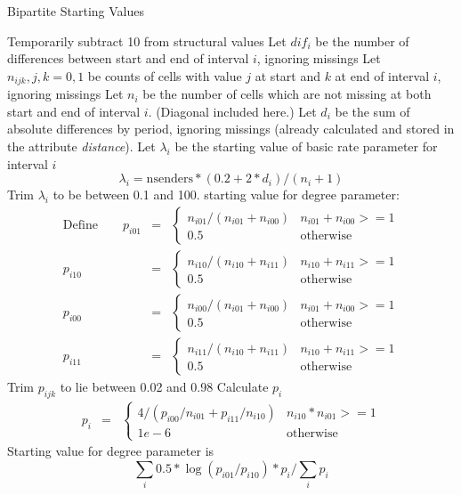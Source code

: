 \documentclass[12pt,a4paper]{article}
\makeatletter
\renewcommand{\=}{\,=\,}
\newcommand{\+}{\,+\,}
\newcommand{\nnm}[1]{\textsf{\small\textit{#1}}}
\renewcommand{\subsection}{\@startsection{subsection}{2}
                {0pt}{0.7\baselineskip}{0.3\baselineskip}
                {\sffamily} }
\makeatother
\begin{document}
\subsection{Bipartite Starting Values}
\label{sec:bipartitestart}
\begin{algorithmic}
\STATE Temporarily subtract 10 from structural values
\STATE Let $dif_i$ be the number of differences between start and end of
interval $i$, ignoring missings
\STATE Let $n_{ijk}, j, k = 0,1$ be counts of cells with value $j$ at start
and $k$ at end of interval $i$, ignoring missings
\STATE Let $n_i$ be the number of cells which are not missing at both start
and end of interval $i$. (Diagonal included here.)
\STATE Let $d_i$ be the sum of absolute differences by period, ignoring missings
(already calculated and stored in the attribute \nnm{distance}).
\STATE Let $\lambda_i$ be the starting value of basic rate parameter for
interval $i$
\STATE
$$\lambda_i = \mathrm{nsenders} * (0.2 + 2 * d_i)/(n_i + 1)$$
\STATE Trim $\lambda_i$ to be between 0.1 and 100.
\STATE starting value for degree parameter:
\begin{align*}
\mathrm{Define } \qquad  p_{i01} &=& \begin{cases}
n_{i01}/ (n_{i01} + n_{i00}) &n_{i01} + n_{i00} >= 1  \\
0.5& \mathrm{otherwise}
\end{cases}\\
p_{i10} &=& \begin{cases}
n_{i10}/ (n_{i10} + n_{i11}) &n_{i10} + n_{i11} >= 1  \\
0.5& \mathrm{otherwise}
\end{cases}\\
  p_{i00} &=& \begin{cases}
n_{i00}/ (n_{i01} + n_{i00}) &n_{i01} + n_{i00} >= 1  \\
0.5& \mathrm{otherwise}
\end{cases}\\
p_{i11} &=& \begin{cases}
n_{i11}/ (n_{i10} + n_{i11}) &n_{i10} + n_{i11} >= 1  \\
0.5& \mathrm{otherwise}
\end{cases}
\end{align*}
\STATE Trim $p_{ijk}$ to lie between 0.02 and 0.98
\STATE Calculate $p_i$
\begin{align*}
p_i &=& \begin{cases}
4 / (p_{i00} / n_{i01} + p_{i11} / n_{i10})& n_{i10} * n_{i01} >= 1  \\
1e-6& \mathrm{otherwise}
\end{cases}
\end{align*}
\STATE Starting value for degree parameter is\\
$$ \sum_i 0.5 * \log(p_{i01} / p_{i10}) * p_i / \sum_i p_i $$
\end{algorithmic}
\end{document}
